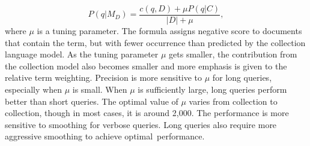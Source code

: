 \begin{equation}
\label{eq:bayessmoothing}
 P(q|M_{D}) = \frac{c(q,D) + \mu P(q|C)}{|D| + \mu},
\end{equation} 
where $ \mu $ is a tuning parameter.
The formula assigns negative score to documents that contain the term, but with fewer occurrence than predicted by the collection language model. As the tuning parameter $ \mu $ gets smaller, the contribution from the collection model also becomes smaller and more emphasis is given to the relative term weighting. Precision is more sensitive to $ \mu $ for long queries, especially when $ \mu $ is small. When $ \mu $ is sufficiently large, long queries perform better than short queries. The optimal value of $ \mu $ varies from collection to collection, though in most cases, it is around 2,000. The performance is more sensitive to smoothing for verbose queries. Long queries also require more aggressive smoothing to achieve optimal~performance. 